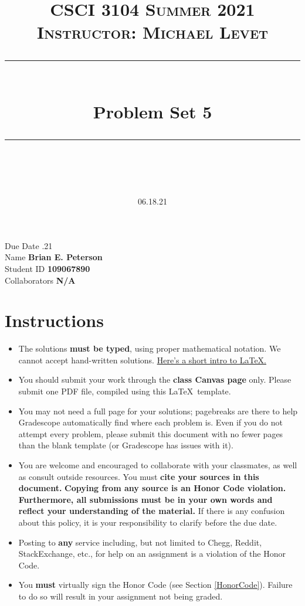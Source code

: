 \documentclass[11pt]{article}
\title{
\normalfont \normalsize 
\textsc{CSCI 3104 Summer 2021 \\ 
Instructor: Michael Levet} \\
[10pt] 
\rule{\linewidth}{0.5pt} \\[6pt] 
\huge Problem Set 5 \\
\rule{\linewidth}{2pt}  \\[10pt]
}
\date{06.18.21}
\theoremstyle{definition}
\theoremstyle{definition}
\theoremstyle{definition}
\begin{document}
\maketitle


\noindent
Due Date .21 \\
Name \dotfill \textbf{Brian E. Peterson} \\
Student ID \dotfill \textbf{109067890} \\
Collaborators \dotfill \textbf{N/A}

\tableofcontents

\section{Instructions}
 \begin{itemize}
	\item The solutions \textbf{must be typed}, using proper mathematical notation. We cannot accept hand-written solutions. \href{http://ece.uprm.edu/~caceros/latex/introduction.pdf}{Here's a short intro to \LaTeX.}
	\item You should submit your work through the \textbf{class Canvas page} only. Please submit one PDF file, compiled using this \LaTeX \ template.
	\item You may not need a full page for your solutions; pagebreaks are there to help Gradescope automatically find where each problem is. Even if you do not attempt every problem, please submit this document with no fewer pages than the blank template (or Gradescope has issues with it).

	\item You are welcome and encouraged to collaborate with your classmates, as well as consult outside resources. You must \textbf{cite your sources in this document.} \textbf{Copying from any source is an Honor Code violation. Furthermore, all submissions must be in your own words and reflect your understanding of the material.} If there is any confusion about this policy, it is your responsibility to clarify before the due date. 

	\item Posting to \textbf{any} service including, but not limited to Chegg, Reddit, StackExchange, etc., for help on an assignment is a violation of the Honor Code.

	\item You \textbf{must} virtually sign the Honor Code (see Section \ref{HonorCode}). Failure to do so will result in your assignment not being graded.
\end{itemize}
\end{document}
